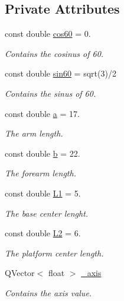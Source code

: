 \subsection*{Private Attributes}
\begin{DoxyCompactItemize}
\item 
const double \hyperlink{class_servo_thread_a86dc58ff23326f939cd6fb610ac90d53}{cos60} = 0.
\begin{DoxyCompactList}\small\item\em Contains the cosinus of 60. \end{DoxyCompactList}\item 
const double \hyperlink{class_servo_thread_aaa3e2dd194949b12f8a41ebd0d62fde9}{sin60} = sqrt(3)/2
\begin{DoxyCompactList}\small\item\em Contains the sinus of 60. \end{DoxyCompactList}\item 
const double \hyperlink{class_servo_thread_a7dc3998d380d61406fe4485f9872edff}{a} = 17.
\begin{DoxyCompactList}\small\item\em The arm length. \end{DoxyCompactList}\item 
const double \hyperlink{class_servo_thread_a14f03febaa39a60b9bf7ff9b9151060c}{b} = 22.
\begin{DoxyCompactList}\small\item\em The forearm length. \end{DoxyCompactList}\item 
const double \hyperlink{class_servo_thread_a6281142e50115dd8c914c14cfae6f90d}{L1} = 5.
\begin{DoxyCompactList}\small\item\em The base center lenght. \end{DoxyCompactList}\item 
const double \hyperlink{class_servo_thread_a3d51c16b1f498b48a6ecbfaadaba6ed2}{L2} = 6.
\begin{DoxyCompactList}\small\item\em The platform center length. \end{DoxyCompactList}\item 
Q\+Vector$<$ float $>$ \hyperlink{class_servo_thread_aad24ef961ee39dd35766c725c13b11b7}{\+\_\+axis}
\begin{DoxyCompactList}\small\item\em Contains the axis value. \end{DoxyCompactList}\item 

\end{DoxyCompactItemize}
